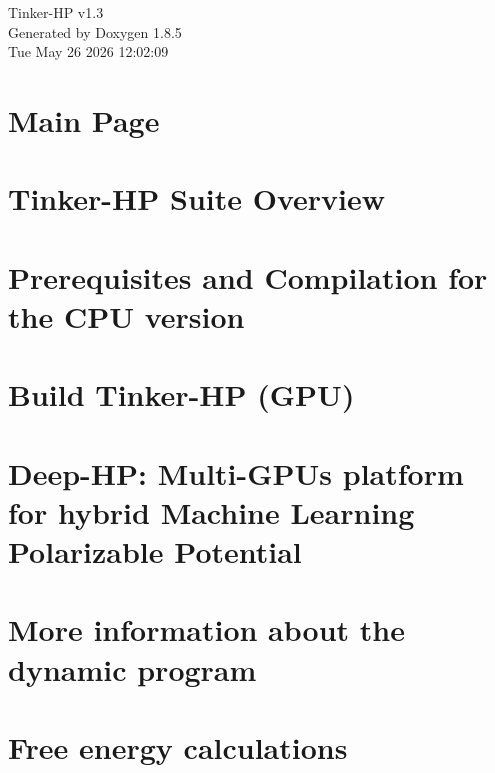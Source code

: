 \documentclass[twoside]{book}
\newcommand{\clearemptydoublepage}{%
  \newpage{\pagestyle{empty}\cleardoublepage}%
}
\begin{document}
\hypersetup{pageanchor=false}
\begin{titlepage}
\vspace*{7cm}
\begin{center}%
{\Large Tinker-\/\-H\-P v1.3 }\\
\vspace*{1cm}
{\large Generated by Doxygen 1.8.5}\\
\vspace*{0.5cm}
{\small Tue May 26 2026 12:02:09}\\
\end{center}
\end{titlepage}
\clearemptydoublepage
\tableofcontents
\clearemptydoublepage
{}
\hypersetup{pageanchor=true}

\chapter{Main Page}
\label{index}\hypertarget{index}{}
\chapter{Tinker-\/\-H\-P Suite Overview}
\label{md_binaries_doxygen}
\hypertarget{md_binaries_doxygen}{}

\chapter{Prerequisites and Compilation for the C\-P\-U version}
\label{md_Build_CPU}
\hypertarget{md_Build_CPU}{}

\chapter{Build Tinker-\/\-H\-P (G\-P\-U)}
\label{md_Build_GPU}
\hypertarget{md_Build_GPU}{}

\chapter{Deep-\/\-H\-P\-: Multi-\/\-G\-P\-Us platform for hybrid Machine Learning Polarizable Potential}
\label{md_Deep-HP}
\hypertarget{md_Deep-HP}{}

\chapter{More information about the dynamic program }
\label{md_dynamic_doxygen}
\hypertarget{md_dynamic_doxygen}{}

\chapter{Free energy calculations }
\label{md_free_energy}
\hypertarget{md_free_energy}{}

\end{document}
